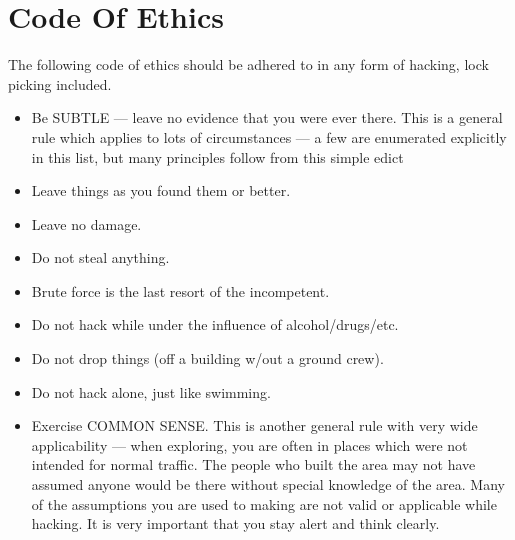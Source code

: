 \appendix
\chapter{Code Of Ethics}
The following code of ethics should be adhered to in any form of hacking, lock picking included.
\begin{itemize}
    \item Be SUBTLE — leave no evidence that you were ever there. This is a general rule which applies to lots of circumstances — a few are enumerated explicitly in this list, but many principles follow from this simple edict
    \item Leave things as you found them or better.
    \item Leave no damage.
    \item Do not steal anything.
    \item Brute force is the last resort of the incompetent.
    \item Do not hack while under the influence of alcohol/drugs/etc.
    \item Do not drop things (off a building w/out a ground crew).
    \item Do not hack alone, just like swimming.
    \item Exercise COMMON SENSE. This is another general rule with very wide applicability — when exploring, you are often in places which were not intended for normal traffic. The people who built the area may not have assumed anyone would be there without special knowledge of the area. Many of the assumptions you are used to making are not valid or applicable while hacking. It is very important that you stay alert and think clearly.
\end{itemize}
